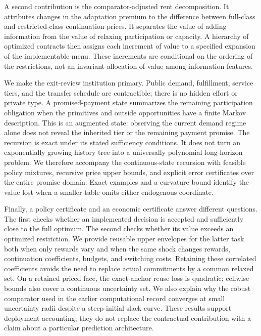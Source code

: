 \documentclass[11pt,letterpaper]{article}
\theoremstyle{definition}\newtheorem{assumption}[theorem]{Assumption}
\begin{document}
A second contribution is the comparator-adjusted rent decomposition. It attributes changes in the adaptation premium to the difference between full-class and restricted-class continuation prices. It separates the value of adding information from the value of relaxing participation or capacity. A hierarchy of optimized contracts then assigns each increment of value to a specified expansion of the implementable menu. These increments are conditional on the ordering of the restrictions, not an invariant allocation of value among information features.

We make the exit-review institution primary. Public demand, fulfillment, service tiers, and the transfer schedule are contractible; there is no hidden effort or private type. A promised-payment state summarizes the remaining participation obligation when the primitives and outside opportunities have a finite Markov description. This is an augmented state: observing the current demand regime alone does not reveal the inherited tier or the remaining payment promise. The recursion is exact under its stated sufficiency conditions. It does not turn an exponentially growing history tree into a universally polynomial long-horizon problem. We therefore accompany the continuous-state recursion with feasible policy mixtures, recursive price upper bounds, and explicit error certificates over the entire promise domain. Exact examples and a curvature bound identify the value lost when a smaller table omits either endogenous coordinate.

Finally, a policy certificate and an economic certificate answer different questions. The first checks whether an implemented decision is accepted and sufficiently close to the full optimum. The second checks whether its value exceeds an optimized restriction. We provide reusable upper envelopes for the latter task both when only rewards vary and when the same shock changes rewards, continuation coefficients, budgets, and switching costs. Retaining these correlated coefficients avoids the need to replace actual commitments by a common relaxed set. On a retained priced face, the exact-anchor reuse loss is quadratic; cellwise bounds also cover a continuous uncertainty set. We also explain why the robust comparator used in the earlier computational record converges at small uncertainty radii despite a steep initial slack curve. These results support deployment accounting; they do not replace the contractual contribution with a claim about a particular prediction architecture.
\end{document}
